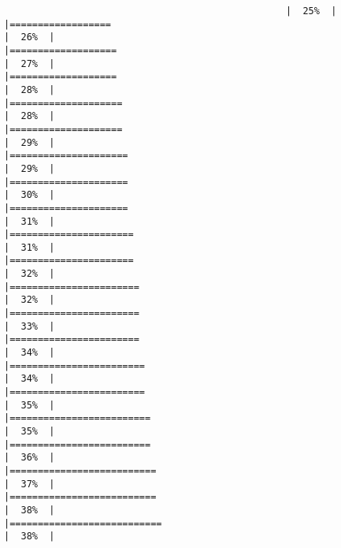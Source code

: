 \documentclass[
]{article}
\begin{document}
\begin{verbatim}
                                                  |  25%  |                                                                              |==================                                                    |  26%  |                                                                              |===================                                                   |  27%  |                                                                              |===================                                                   |  28%  |                                                                              |====================                                                  |  28%  |                                                                              |====================                                                  |  29%  |                                                                              |=====================                                                 |  29%  |                                                                              |=====================                                                 |  30%  |                                                                              |=====================                                                 |  31%  |                                                                              |======================                                                |  31%  |                                                                              |======================                                                |  32%  |                                                                              |=======================                                               |  32%  |                                                                              |=======================                                               |  33%  |                                                                              |=======================                                               |  34%  |                                                                              |========================                                              |  34%  |                                                                              |========================                                              |  35%  |                                                                              |=========================                                             |  35%  |                                                                              |=========================                                             |  36%  |                                                                              |==========================                                            |  37%  |                                                                              |==========================                                            |  38%  |                                                                              |===========================                                           |  38%  |                                                                              
\end{verbatim}
\end{document}

